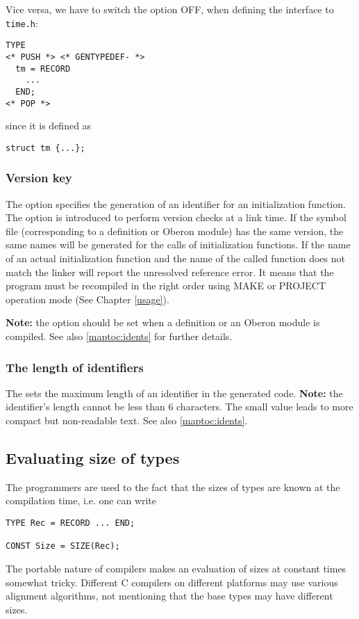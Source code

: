 Vice versa, we have to switch the option OFF,
when defining the interface to {\tt time.h}:
\begin{verbatim}
TYPE
<* PUSH *> <* GENTYPEDEF- *>
  tm = RECORD
    ...
  END;
<* POP *>
\end{verbatim}
since it is defined as
\begin{verbatim}
struct tm {...};
\end{verbatim}

\subsubsection{Version key}

The  option
specifies the generation of an identifier for an initialization function.
The option is introduced to perform version checks
at a link time. If the symbol file (corresponding to a definition
or Oberon module) has the same version, the same names will be
generated for the calls of initialization functions.
If the name of an actual initialization function and the name
of the called function does not match the linker will report
the unresolved reference error. It means that the program
must be recompiled in the right order using MAKE or
PROJECT operation mode (See Chapter \ref{usage}).

{\bf Note:} the option should be set when
a definition or an Oberon module is compiled. See also \ref{maptoc:idents}
for further details.

\subsubsection{The length of identifiers}

The   sets the
maximum  length  of an identifier in the generated code. {\bf Note:}
the identifier's length cannot be less than 6 characters. The small
value  leads  to  more  compact  but  non-readable text. See also
\ref{maptoc:idents}.

\subsection{Evaluating size of types}\label{maptoc:opt:sizeof}

The  programmers  are  used  to  the fact that the sizes of types are
known at the compilation time, i.e. one can write
\begin{verbatim}
TYPE Rec = RECORD ... END;

CONST Size = SIZE(Rec);
\end{verbatim}
The  portable  nature  of \xds{} compilers makes an evaluation of
sizes at constant times somewhat tricky. Different C compilers on
different  platforms  may use various alignment algorithms, not
mentioning that the base types may have different sizes.


